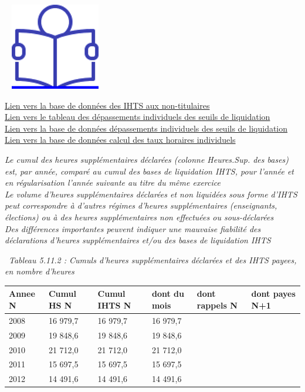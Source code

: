 ~
\href{../Docs/Notices/fiche_liquidation_IHTS.odt}{\includegraphics{icones/Notice.png}}

\href{../Bases/Reglementation/Base.IHTS.non.tit.csv}{Lien vers la base de
données des IHTS aux non-titulaires}\\
\href{../Bases/Reglementation/depassement.agent.annee.csv}{Lien vers le
tableau des dépassements individuels des seuils de liquidation}\\
\href{../Bases/Reglementation/depassement.agent.csv}{Lien vers la base de
données dépassements individuels des seuils de liquidation}\\
\href{../Bases/Reglementation/Taux.horaires.csv}{Lien vers la base de
données calcul des taux horaires individuels}

\emph{Le cumul des heures supplémentaires déclarées (colonne Heures.Sup.
des bases) est, par année, comparé au cumul des bases de liquidation
IHTS, pour l'année et en régularisation l'année suivante au titre du
même exercice}\\
\emph{Le volume d'heures supplémentaires déclarées et non liquidées sous
forme d'IHTS peut correspondre à d'autres régimes d'heures
supplémentaires (enseignants, élections) ou à des heures supplémentaires
non effectuées ou sous-déclarées}\\
\emph{Des différences importantes peuvent indiquer une mauvaise
fiabilité des déclarations d'heures supplémentaires et/ou des bases de
liquidation IHTS}

~\emph{Tableau 5.11.2 : Cumuls d'heures supplémentaires déclarées et des
IHTS payees, en nombre d'heures}

\begin{longtable}[]{@{}llllll@{}}
\toprule
Annee N & Cumul HS N & Cumul IHTS N & dont du mois & dont rappels N &
dont payes N+1\tabularnewline
\midrule
\endhead
2008 & 16 979,7 & 16 979,7 & 16 979,7 & &\tabularnewline
2009 & 19 848,6 & 19 848,6 & 19 848,6 & &\tabularnewline
2010 & 21 712,0 & 21 712,0 & 21 712,0 & &\tabularnewline
2011 & 15 697,5 & 15 697,5 & 15 697,5 & &\tabularnewline
2012 & 14 491,6 & 14 491,6 & 14 491,6 & &\tabularnewline
\bottomrule
\end{longtable}

